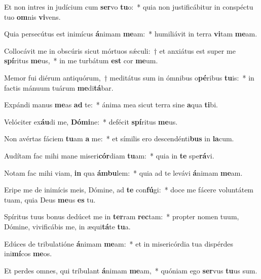 \item Et non intres in judícium cum \textbf{ser}vo \textbf{tu}o:~* quia non justificábitur in conspéctu tuo \textbf{om}nis \textbf{vi}vens.
\item Quia persecútus est inimícus \textbf{á}nimam \textbf{me}am:~* humiliávit in terra \textbf{vi}tam \textbf{me}am.
\item Collocávit me in obscúris sicut mórtuos sǽculi:~† et anxiátus est super me \textbf{spí}ritus \textbf{me}us,~* in me turbátum \textbf{est} cor \textbf{me}um.
\item Memor fui diérum antiquórum,~† meditátus sum in ómnibus o\textbf{pé}ribus \textbf{tu}is:~* in factis mánuum tuárum \textbf{me}di\textbf{tá}bar.
\item Expándi manus \textbf{me}as \textbf{ad} te:~* ánima mea sicut terra sine \textbf{a}qua \textbf{ti}bi.
\item Velóciter ex\textbf{áu}di me, \textbf{Dó}\textbf{mi}ne:~* defécit \textbf{spí}ritus \textbf{me}us.
\item Non avértas fáciem \textbf{tu}am \textbf{a} me:~* et símilis ero descendénti\textbf{bus} in \textbf{la}cum.
\item Audítam fac mihi mane miseri\textbf{cór}diam \textbf{tu}am:~* quia in \textbf{te} spe\textbf{rá}vi.
\item Notam fac mihi viam, \textbf{in} qua \textbf{ám}\textbf{bu}lem:~* quia ad te levávi \textbf{á}nimam \textbf{me}am.
\item Eripe me de inimícis meis, Dómine, ad \textbf{te} con\textbf{fú}gi:~* doce me fácere voluntátem tuam, quia Deus \textbf{me}us \textbf{es} tu.
\item Spíritus tuus bonus dedúcet me in \textbf{ter}ram \textbf{rec}tam:~* propter nomen tuum, Dómine, vivificábis me, in æqui\textbf{tá}te \textbf{tu}a.
\item Edúces de tribulatióne \textbf{á}nimam \textbf{me}am:~* et in misericórdia tua dispérdes ini\textbf{mí}cos \textbf{me}os.
\item Et perdes omnes, qui tríbulant \textbf{á}nimam \textbf{me}am,~* quóniam ego \textbf{ser}vus \textbf{tu}us sum.

